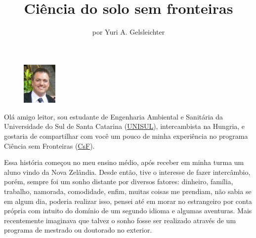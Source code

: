 \title{Ciência do solo sem fronteiras}
\author{por Yuri A. Gelsleichter}
\maketitle

\begin{figure}
\includegraphics[width=0.15\textwidth]{figuras/yuri-foto}
\end{figure}

Olá amigo leitor, sou estudante de Engenharia Ambiental e Sanitária da Universidade do Sul de Santa Catarina (\href{http://www.unisul.br/wps/portal/home/}{UNISUL}), intercambista na Hungria, e gostaria de compartilhar com você um pouco de minha experiência no programa Ciência sem Fronteiras (\href{http://www.cienciasemfronteiras.gov.br/web/csf}{CsF}).

Essa história começou no meu ensino médio, após receber em minha turma um aluno vindo da Nova Zelândia. Desde então, tive o interesse de fazer intercâmbio, porém, sempre foi um sonho distante por diversos fatores: dinheiro, família, trabalho, namorada, comodidade, enfim, muitas coisas me prendiam, não sabia se em algum dia, poderia realizar isso, pensei até em morar no estrangeiro por conta própria com intuito do domínio de um segundo idioma e algumas aventuras. Mais recentemente imaginava que talvez o sonho fosse ser realizado através de um programa de mestrado ou doutorado no exterior.

